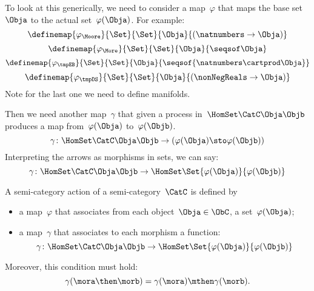 To look at this generically, we need to consider a map~$\varphi$ that maps the base set~$\Obja$ to the actual set~$\varphi(\Obja)$. For example:
\begin{equation}
  \definemap{\varphi_{\Moore}}{\Set}{\Set}{\Obja}{(\natnumbers \to \Obja)}
\end{equation}
\begin{equation}
\definemap{\varphi_{\More}}{\Set}{\Set}{\Obja}{\seqsof \Obja}
\end{equation}
\begin{equation}
\definemap{\varphi_{\tmpEB}}{\Set}{\Set}{\Obja}{\seqsof{\natnumbers \cartprod \Obja}}
\end{equation}
\begin{equation}
\definemap{\varphi_{\tmpDS}}{\Set}{\Set}{\Obja}{(\nonNegReals \to \Obja)}
\end{equation}
Note for the last one we need to define manifolds.

Then we need another map~$\gamma$ that given a process in~$\HomSet\CatC\Obja\Objb$
produces a map from~$\varphi(\Obja)$ to~$\varphi(\Objb)$.
% 
\begin{equation}
  \gamma\colon \HomSet\CatC\Obja\Objb \to  (\varphi(\Obja) \sto \varphi(\Objb))
\end{equation}
% 
Interpreting the arrows as morphisms in sets, we can say:
\begin{equation}
  \gamma\colon \HomSet\CatC\Obja\Objb \to  \HomSet\Set{\varphi(\Obja)}{\varphi(\Objb) }
\end{equation}

\begin{ctdefinition}
  A semi-category action of a semi-category~$\CatC$ is defined by
  \begin{itemize}
    \item a map~$\varphi$ that associates from each object~$\Obja \in \ObC$, a set~$\varphi(\Obja)$;
    \item a map~$\gamma$ that associates to each morphism a function:
    \begin{equation}
      \gamma\colon \HomSet\CatC\Obja\Objb \to  \HomSet\Set{\varphi(\Obja)}{\varphi(\Objb) }
    \end{equation}
  \end{itemize}
  Moreover, this condition must hold:
  \begin{equation}
    \gamma(\mora\then\morb) = \gamma(\mora) \mthen \gamma(\morb).
  \end{equation}
\end{ctdefinition}

